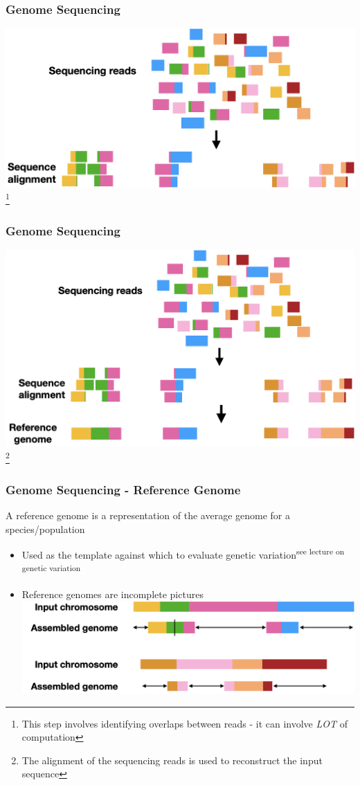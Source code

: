 \documentclass{beamer}
\newcommand\blfootnote[1]{%
	\begingroup
	\renewcommand\thefootnote{}\footnote{#1}%
	\addtocounter{footnote}{-1}%
	\endgroup
}
\begin{document}
\begin{frame}
	\frametitle{Genome Sequencing}
	\includegraphics[width=\textwidth]{img/reads2Alignment}
	\blfootnote{This step involves identifying overlaps between reads - it can involve \textit{LOT} of computation}
\end{frame} 

\begin{frame}
	\frametitle{Genome Sequencing}
	\includegraphics[width=\textwidth]{img/alignment2reference}
	\blfootnote{The alignment of the sequencing reads is used to reconstruct the input sequence }
\end{frame}

\begin{frame}
	\frametitle{Genome Sequencing - Reference Genome}

A reference genome is a representation of the average genome for a species/population
\begin{itemize}
	\item Used as the template against which to evaluate genetic variation\textsuperscript{see lecture on genetic variation}
	\item Reference genomes are incomplete pictures\\
	\vspace{20pt}
		\includegraphics[width=\textwidth]{img/shortReadReference}
\end{itemize}
\end{frame}
\end{document}
